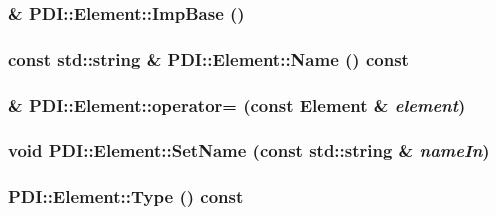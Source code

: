 \hypertarget{class_p_d_i_1_1_element_c4724e42d490ba55df98452fb73b2866}{
\subsubsection[{ImpBase}]{ \& PDI::Element::ImpBase ()}}
\label{class_p_d_i_1_1_element_c4724e42d490ba55df98452fb73b2866}


\hypertarget{class_p_d_i_1_1_element_8d0e2eca3eea1084ea2fe4dce22ee3c8}{
\subsubsection[{Name}]{\setlength{\rightskip}{0pt plus 5cm}const std::string \& PDI::Element::Name () const}}
\label{class_p_d_i_1_1_element_8d0e2eca3eea1084ea2fe4dce22ee3c8}


\hypertarget{class_p_d_i_1_1_element_f549e116d18ba2209ea4e9a8b06b5452}{
\subsubsection[{operator=}]{ \& PDI::Element::operator= (const {\bf Element} \& {\em element})}}
\label{class_p_d_i_1_1_element_f549e116d18ba2209ea4e9a8b06b5452}


\hypertarget{class_p_d_i_1_1_element_dc2054db4dede7a74eee4ec5e981b159}{
\subsubsection[{SetName}]{\setlength{\rightskip}{0pt plus 5cm}void PDI::Element::SetName (const std::string \& {\em nameIn})}}
\label{class_p_d_i_1_1_element_dc2054db4dede7a74eee4ec5e981b159}


\hypertarget{class_p_d_i_1_1_element_e5a82dd1ebdd0e3c70f4cf690576984b}{
\subsubsection[{Type}]{ PDI::Element::Type () const}}
\label{class_p_d_i_1_1_element_e5a82dd1ebdd0e3c70f4cf690576984b}




